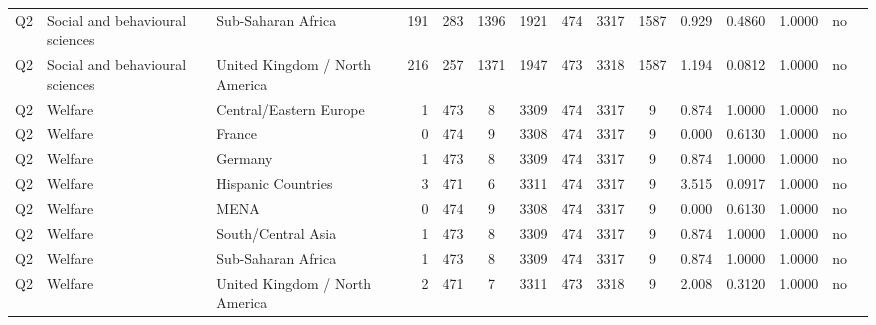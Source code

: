 \begin{longtable}{lllrcccccccccll}
Q2 & Social and behavioural sciences & Sub-Saharan Africa & 191 & 283 & 1396 & 1921 & 474 & 3317 & 1587 & 0.929 & 0.4860 & 1.0000 & no \\
Q2 & Social and behavioural sciences & United Kingdom / North America & 216 & 257 & 1371 & 1947 & 473 & 3318 & 1587 & 1.194 & 0.0812 & 1.0000 & no \\
Q2 & Welfare & Central/Eastern Europe & 1 & 473 & 8 & 3309 & 474 & 3317 & 9 & 0.874 & 1.0000 & 1.0000 & no \\
Q2 & Welfare & France & 0 & 474 & 9 & 3308 & 474 & 3317 & 9 & 0.000 & 0.6130 & 1.0000 & no \\
Q2 & Welfare & Germany & 1 & 473 & 8 & 3309 & 474 & 3317 & 9 & 0.874 & 1.0000 & 1.0000 & no \\
Q2 & Welfare & Hispanic Countries & 3 & 471 & 6 & 3311 & 474 & 3317 & 9 & 3.515 & 0.0917 & 1.0000 & no \\
Q2 & Welfare & MENA & 0 & 474 & 9 & 3308 & 474 & 3317 & 9 & 0.000 & 0.6130 & 1.0000 & no \\
Q2 & Welfare & South/Central Asia & 1 & 473 & 8 & 3309 & 474 & 3317 & 9 & 0.874 & 1.0000 & 1.0000 & no \\
Q2 & Welfare & Sub-Saharan Africa & 1 & 473 & 8 & 3309 & 474 & 3317 & 9 & 0.874 & 1.0000 & 1.0000 & no \\
Q2 & Welfare & United Kingdom / North America & 2 & 471 & 7 & 3311 & 473 & 3318 & 9 & 2.008 & 0.3120 & 1.0000 & no \\
\end{longtable}
